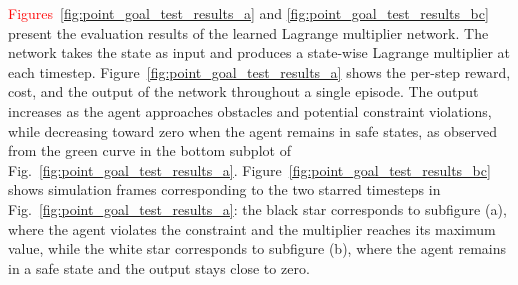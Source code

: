 \textcolor{red}{Figures}~\ref{fig:point_goal_test_results_a} and \ref{fig:point_goal_test_results_bc} present the evaluation results of the learned Lagrange multiplier network. 
The network takes the state as input and produces a state-wise Lagrange multiplier at each timestep.
Figure~\ref{fig:point_goal_test_results_a} shows the per-step reward, cost, and the output of the network throughout a single episode.
The output increases as the agent approaches obstacles and potential constraint violations, while decreasing toward zero when the agent remains in safe states, as observed from the green curve in the bottom subplot of Fig.~\ref{fig:point_goal_test_results_a}.
Figure~\ref{fig:point_goal_test_results_bc} shows simulation frames corresponding to the two starred timesteps in Fig.~\ref{fig:point_goal_test_results_a}: the black star corresponds to subfigure (a), where the agent violates the constraint and the multiplier reaches its maximum value, while the white star corresponds to subfigure (b), where the agent remains in a safe state and the output stays close to zero.